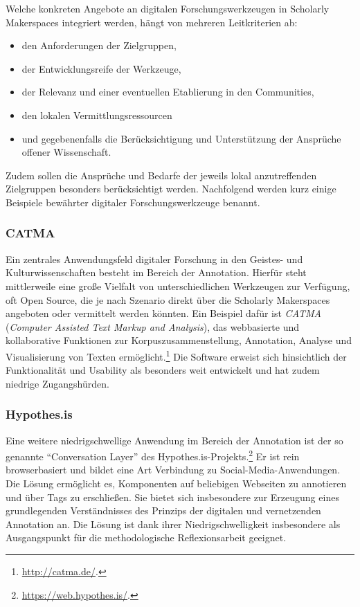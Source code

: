 \documentclass[a4paper,
fontsize=11pt,
oneside,
numbers=noperiodatend,
parskip=half-,
bibliography=totoc,
final
]{scrartcl}
\begin{document}
Welche konkreten Angebote an digitalen Forschungswerkzeugen in Scholarly
Makerspaces integriert werden, hängt von mehreren Leitkriterien ab:

\begin{itemize}

\item
  den Anforderungen der Zielgruppen,
\item
  der Entwicklungsreife der Werkzeuge,
\item
  der Relevanz und einer eventuellen Etablierung in den Communities,
\item
  den lokalen Vermittlungsressourcen
\item
  und gegebenenfalls die Berücksichtigung und Unterstützung der
  Ansprüche offener Wissenschaft.
\end{itemize}

Zudem sollen die Ansprüche und Bedarfe der jeweils lokal anzutreffenden
Zielgruppen besonders berücksichtigt werden. Nachfolgend werden kurz
einige Beispiele bewährter digitaler Forschungswerkzeuge benannt.

\hypertarget{catma}{%
\subsubsection{CATMA}\label{catma}}

Ein zentrales Anwendungsfeld digitaler Forschung in den Geistes- und
Kulturwissenschaften besteht im Bereich der Annotation. Hierfür steht
mittlerweile eine große Vielfalt von unterschiedlichen Werkzeugen zur
Verfügung, oft Open Source, die je nach Szenario direkt über die
Scholarly Makerspaces angeboten oder vermittelt werden könnten. Ein
Beispiel dafür ist \emph{CATMA} (\emph{Computer Assisted Text Markup and
Analysis}), das webbasierte und kollaborative Funktionen zur
Korpuszusammenstellung, Annotation, Analyse und Visualisierung von
Texten ermöglicht.\footnote{\url{http://catma.de/}.} Die Software
erweist sich hinsichtlich der Funktionalität und Usability als besonders
weit entwickelt und hat zudem niedrige Zugangshürden.

\hypertarget{hypothes.is}{%
\subsubsection{Hypothes.is}\label{hypothes.is}}

Eine weitere niedrigschwellige Anwendung im Bereich der Annotation ist
der so genannte \enquote{Conversation Layer} des
Hypothes.is-Projekts.\footnote{\url{https://web.hypothes.is/}.} Er ist
rein browserbasiert und bildet eine Art Verbindung zu
Social-Media-Anwendungen. Die Lösung ermöglicht es, Komponenten auf
beliebigen Webseiten zu annotieren und über Tags zu erschließen. Sie
bietet sich insbesondere zur Erzeugung eines grundlegenden
Verständnisses des Prinzips der digitalen und vernetzenden Annotation
an. Die Lösung ist dank ihrer Niedrigschwelligkeit insbesondere als
Ausgangspunkt für die methodologische Reflexionsarbeit geeignet.
\end{document}
